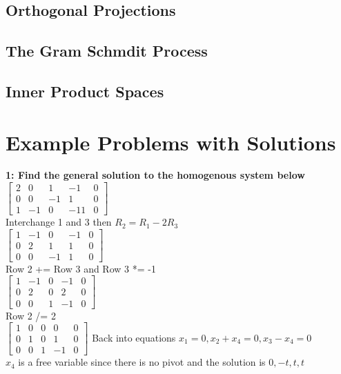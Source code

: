 \documentclass{article}
\begin{document}
\subsection{Orthogonal Projections}
\subsection{The Gram Schmdit Process}
\subsection{Inner Product Spaces}
\pagebreak
\section{Example Problems with Solutions}
\textbf{1: Find the general solution to the homogenous system below}\\[0.1in]
$\left[\begin{array}{cccc|c}
2 & 0 & 1 & -1 & 0 \\
0 & 0 & -1 & 1 & 0 \\
1 & -1 & 0 & -11 & 0
\end{array}\right]$
\\[0.05in]Interchange 1 and 3 then $R_2 = R_1-2R_3$\\[0.05in]
$\left[\begin{array}{cccc|c}
1 & -1 & 0 & -1 & 0 \\
0 & 2 & 1 & 1 & 0 \\
0 & 0 & -1 & 1 & 0
\end{array}\right]$
\\[0.05in]Row 2 += Row 3 and Row 3 *= -1\\[0.05in]
$\left[\begin{array}{cccc|c}
1 & -1 & 0 & -1 & 0 \\
0 & 2 & 0 & 2 & 0 \\
0 & 0 & 1 & -1 & 0
\end{array}\right]$
\\[0.05in]Row 2 /= 2\\[0.05in]
$\left[\begin{array}{cccc|c}
1 & 0 & 0 & 0 & 0 \\
0 & 1 & 0 & 1 & 0 \\
0 & 0 & 1 & -1 & 0
\end{array}\right]$
Back into equations $x_1=0, x_2+x_4=0, x_3-x_4=0$ \\[0.05in]$x_4$ is a free variable since there is no pivot and the solution is $\boxed{0, -t, t, t}$\\
\end{document}
